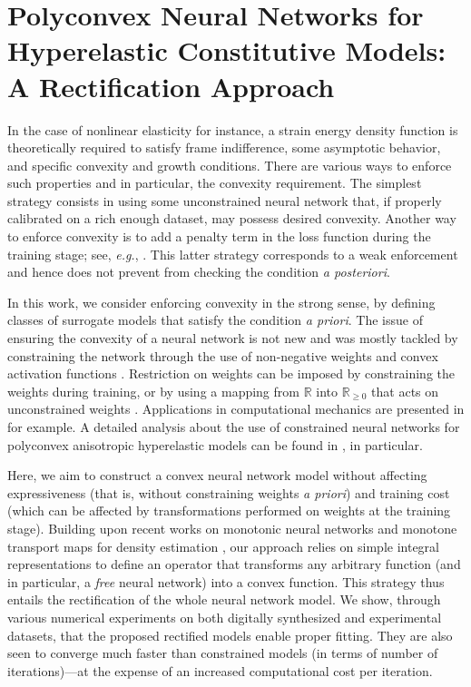 \chapter{Polyconvex Neural Networks for Hyperelastic Constitutive Models: A Rectification Approach}
\label{chap:polyconvex}

In the case of nonlinear elasticity for instance, a strain energy density function is theoretically required to satisfy frame indifference, some asymptotic behavior, and specific convexity and growth conditions. There are various ways to enforce such properties and in particular, the convexity requirement. The simplest strategy consists in using some unconstrained neural network that, if properly calibrated on a rich enough dataset, may possess desired convexity. Another way to enforce convexity is to add a penalty term in the loss function during the training stage; see, \textit{e.g.}, \cite{liu2020generic}. This latter strategy corresponds to a weak enforcement and hence does not prevent from checking the condition \textit{a posteriori}. 

In this work, we consider enforcing convexity in the strong sense, by defining classes of surrogate models that satisfy the condition \textit{a priori}. The issue of ensuring the convexity of a neural network is not new and was mostly tackled by constraining the network through the use of non-negative weights and convex activation functions \cite{amos2017input}. Restriction on weights can be imposed by constraining the weights during training, or by using a mapping from $\mathbb{R}$ into $\mathbb{R}_{\geq 0}$ that acts on unconstrained weights \cite{sivaprasad2021curious,Asad-IJNME}. Applications in computational mechanics are presented in \cite{masi2021thermodynamics, as2022mechanics,Asad-IJNME} for example. A detailed analysis about the use of constrained neural networks for polyconvex anisotropic hyperelastic models can be found in \cite{KLEIN2022104703}, in particular.

Here, we aim to construct a convex neural network model without affecting expressiveness (that is, without constraining weights \textit{a priori}) and training cost (which can be affected by transformations performed on weights at the training stage). Building upon recent works on monotonic neural networks \cite{wehenkel2019unconstrained} and monotone transport maps for density estimation \cite{baptista2020adaptive}, our approach relies on simple integral representations to define an operator that transforms any arbitrary function (and in particular, a \textit{free} neural network) into a convex function. This strategy thus entails the rectification of the whole neural network model. We show, through various numerical experiments on both digitally synthesized and experimental datasets, that the proposed rectified models enable proper fitting. They are also seen to converge much faster than constrained models (in terms of number of iterations)---at the expense of an increased computational cost per iteration. 

